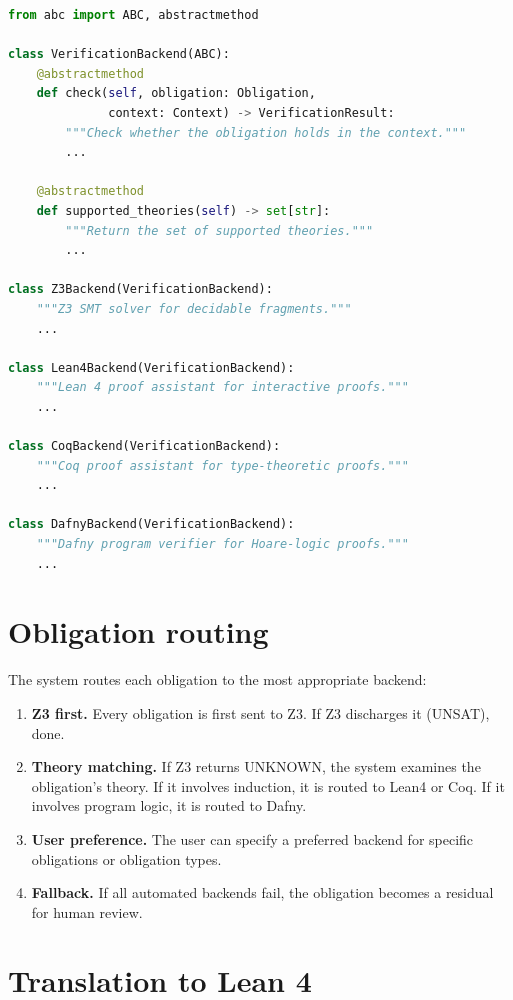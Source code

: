 \documentclass[11pt]{report}
\theoremstyle{definition}
\theoremstyle{plain}
\begin{document}
\begin{lstlisting}[style=deppy,language=Python]
from abc import ABC, abstractmethod

class VerificationBackend(ABC):
    @abstractmethod
    def check(self, obligation: Obligation,
              context: Context) -> VerificationResult:
        """Check whether the obligation holds in the context."""
        ...

    @abstractmethod
    def supported_theories(self) -> set[str]:
        """Return the set of supported theories."""
        ...

class Z3Backend(VerificationBackend):
    """Z3 SMT solver for decidable fragments."""
    ...

class Lean4Backend(VerificationBackend):
    """Lean 4 proof assistant for interactive proofs."""
    ...

class CoqBackend(VerificationBackend):
    """Coq proof assistant for type-theoretic proofs."""
    ...

class DafnyBackend(VerificationBackend):
    """Dafny program verifier for Hoare-logic proofs."""
    ...
\end{lstlisting}

\section{Obligation routing}

The system routes each obligation to the most appropriate backend:

\begin{enumerate}[nosep]
  \item \textbf{Z3 first.} Every obligation is first sent to Z3. If Z3
        discharges it (UNSAT), done.
  \item \textbf{Theory matching.} If Z3 returns UNKNOWN, the system examines
        the obligation's theory. If it involves induction, it is routed to
        Lean4 or Coq. If it involves program logic, it is routed to Dafny.
  \item \textbf{User preference.} The user can specify a preferred backend
        for specific obligations or obligation types.
  \item \textbf{Fallback.} If all automated backends fail, the obligation
        becomes a residual for human review.
\end{enumerate}

\section{Translation to Lean 4}
\end{document}
